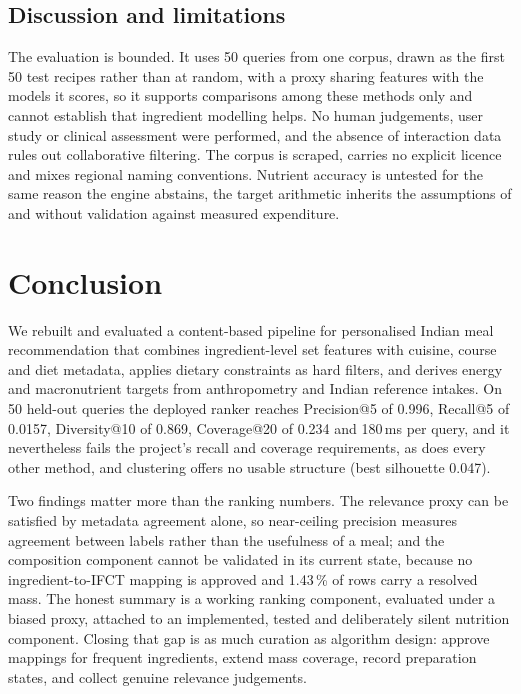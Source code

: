 \documentclass[conference]{IEEEtran}
\begin{document}
\subsection{Discussion and limitations}
\label{sec:limits}

The evaluation is bounded. It uses 50 queries from one corpus, drawn as the first 50 test recipes rather than at random, with a proxy sharing features with the models it scores, so it supports comparisons among these methods only and cannot establish that ingredient modelling helps. No human judgements, user study or clinical assessment were performed, and the absence of interaction data rules out collaborative filtering. The corpus is scraped, carries no explicit licence and mixes regional naming conventions. Nutrient accuracy is untested for the same reason the engine abstains, the target arithmetic inherits the assumptions of \cite{mifflin1990} and \cite{icmrnin2020} without validation against measured expenditure.

\section{Conclusion}
\label{sec:conclusion}

We rebuilt and evaluated a content-based pipeline for personalised Indian meal recommendation
that combines ingredient-level set features with cuisine, course and diet metadata, applies
dietary constraints as hard filters, and derives energy and macronutrient targets from
anthropometry and Indian reference intakes. On 50 held-out queries the deployed ranker reaches
Precision@5 of 0.996, Recall@5 of 0.0157, Diversity@10 of 0.869, Coverage@20 of 0.234 and
180\,ms per query, and it nevertheless fails the
project's recall and coverage requirements, as does every other method, and clustering offers no
usable structure (best silhouette 0.047).

Two findings matter more than the ranking numbers. The relevance proxy can be satisfied by metadata agreement alone, so near-ceiling precision measures agreement between labels rather than the usefulness of a meal; and the composition component cannot be validated in its current state, because no ingredient-to-IFCT mapping is approved and 1.43\,\% of rows carry a resolved mass. The honest summary is a working ranking component, evaluated under a biased proxy, attached to an implemented, tested and deliberately silent nutrition component. Closing that gap is as much curation as algorithm design: approve mappings for frequent ingredients, extend mass coverage, record preparation states, and collect genuine relevance judgements.

\balance


\end{document}
